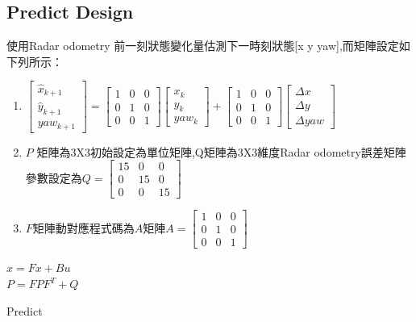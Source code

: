 \documentclass{article}
\begin{document}
\subsection{Predict Design}
使用Radar odometry 前一刻狀態變化量估測下一時刻狀態[x y yaw],而矩陣設定如下列所示：
\begin{enumerate}
	\item $\begin{bmatrix} \hat{x}_{k+1} \\ \hat{y}_{k+1} \\ yaw_{k+1} \end{bmatrix}=\begin{bmatrix} 1 & 0 & 0\\ 0 & 1 & 0\\ 0 & 0& 1\end{bmatrix} \begin{bmatrix} x_k \\ y_k \\ yaw_k \end{bmatrix} + \begin{bmatrix} 1 & 0 & 0\\ 0 & 1 & 0\\ 0 & 0 & 1 \end{bmatrix} \begin{bmatrix} \Delta{x} \\ \Delta{y} \\ \Delta{yaw} \end{bmatrix}$
	\item $P $ 矩陣為3X3初始設定為單位矩陣,Q矩陣為3X3維度Radar odometry誤差矩陣參數設定為$Q=\begin{bmatrix} 15 & 0 & 0 \\ 0 & 15 & 0 \\ 0 & 0 & 15\end{bmatrix}$
	\item $F$矩陣動對應程式碼為$A$矩陣$A=\begin{bmatrix} 1 & 0 & 0\\ 0 & 1 & 0\\ 0 & 0 & 1 \end{bmatrix} $
\end{enumerate}

\begin{algorithm}[H]
\DontPrintSemicolon
{}
$\hat{x}=Fx+Bu$ \\
$P=FPF^T+Q$ \\
\label{alg:predict}
\caption{Predict\cite{1}}
\end{algorithm}
\end{document}
